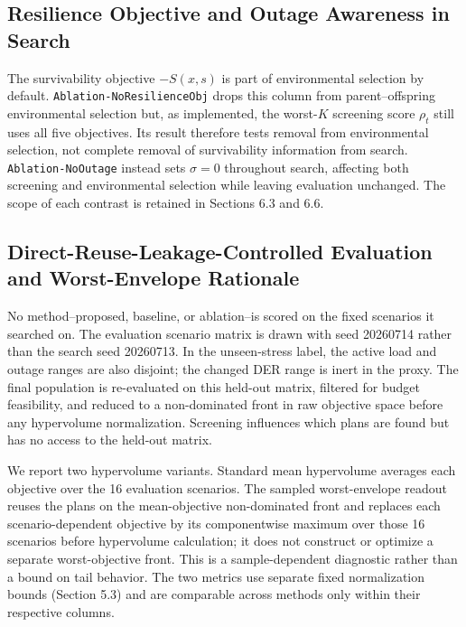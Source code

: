 \documentclass[energies,article,submit,moreauthors]{Definitions/mdpi}
\begin{document}
\subsection{Resilience Objective and Outage Awareness in Search}\label{resilience-objective-and-outage-awareness-in-search}

The survivability objective \(-S(x,s)\) is part of environmental selection by default. \texttt{Ablation-NoResilienceObj} drops this column from parent--offspring environmental selection but, as implemented, the worst-\(K\) screening score \(\rho_t\) still uses all five objectives. Its result therefore tests removal from environmental selection, not complete removal of survivability information from search. \texttt{Ablation-NoOutage} instead sets \(\sigma=0\) throughout search, affecting both screening and environmental selection while leaving evaluation unchanged. The scope of each contrast is retained in Sections 6.3 and 6.6.

\subsection{Direct-Reuse-Leakage-Controlled Evaluation and Worst-Envelope Rationale}\label{direct-reuse-leakage-controlled-evaluation-and-worst-envelope-rationale}

No method--proposed, baseline, or ablation--is scored on the fixed scenarios it searched on. The evaluation scenario matrix is drawn with seed 20260714 rather than the search seed 20260713. In the unseen-stress label, the active load and outage ranges are also disjoint; the changed DER range is inert in the proxy. The final population is re-evaluated on this held-out matrix, filtered for budget feasibility, and reduced to a non-dominated front in raw objective space before any hypervolume normalization. Screening influences which plans are found but has no access to the held-out matrix.

We report two hypervolume variants. Standard mean hypervolume averages each objective over the 16 evaluation scenarios. The sampled worst-envelope readout reuses the plans on the mean-objective non-dominated front and replaces each scenario-dependent objective by its componentwise maximum over those 16 scenarios before hypervolume calculation; it does not construct or optimize a separate worst-objective front. This is a sample-dependent diagnostic rather than a bound on tail behavior. The two metrics use separate fixed normalization bounds (Section 5.3) and are comparable across methods only within their respective columns.
\end{document}
